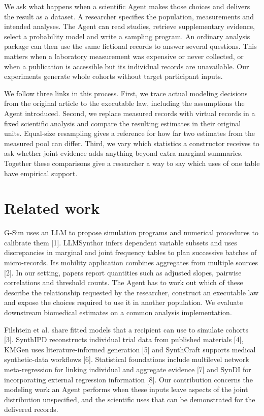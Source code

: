 \documentclass[sigconf,anonymous,nonacm]{acmart}
\begin{document}
We ask what happens when a scientific Agent makes those choices and delivers the result as a dataset. A researcher specifies the population, measurements and intended analyses. The Agent can read studies, retrieve supplementary evidence, select a probability model and write a sampling program. An ordinary analysis package can then use the same fictional records to answer several questions. This matters when a laboratory measurement was expensive or never collected, or when a publication is accessible but its individual records are unavailable. Our experiments generate whole cohorts without target participant inputs.


We follow three links in this process. First, we trace actual modeling decisions from the original article to the executable law, including the assumptions the Agent introduced. Second, we replace measured records with virtual records in a fixed scientific analysis and compare the resulting estimates in their original units. Equal-size resampling gives a reference for how far two estimates from the measured pool can differ. Third, we vary which statistics a constructor receives to ask whether joint evidence adds anything beyond extra marginal summaries. Together these comparisons give a researcher a way to say which uses of one table have empirical support.


\section{Related work}

G-Sim uses an LLM to propose simulation programs and numerical procedures to calibrate them [1]. LLMSynthor infers dependent variable subsets and uses discrepancies in marginal and joint frequency tables to plan successive batches of micro-records. Its mobility application combines aggregates from multiple sources [2]. In our setting, papers report quantities such as adjusted slopes, pairwise correlations and threshold counts. The Agent has to work out which of these describe the relationship requested by the researcher, construct an executable law and expose the choices required to use it in another population. We evaluate downstream biomedical estimates on a common analysis implementation.


Filshtein et al. share fitted models that a recipient can use to simulate cohorts [3]. SynthIPD reconstructs individual trial data from published materials [4], KMGen uses literature-informed generation [5] and SynthCraft supports medical synthetic-data workflows [6]. Statistical foundations include multilevel network meta-regression for linking individual and aggregate evidence [7] and SynDI for incorporating external regression information [8]. Our contribution concerns the modeling work an Agent performs when these inputs leave aspects of the joint distribution unspecified, and the scientific uses that can be demonstrated for the delivered records.
\end{document}
